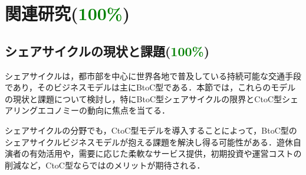 \section{関連研究(\textcolor{green}{100\%})}
  \label{sec:関連研究}
    \par
  
  \subsection{シェアサイクルの現状と課題(\textcolor{green}{100\%})}
    \label{sec:シェアサイクルの現状と課題}
      \par シェアサイクルは，都市部を中心に世界各地で普及している持続可能な交通手段であり，そのビジネスモデルは主にBtoC型である．本節では，これらのモデルの現状と課題について検討し，特にBtoC型シェアサイクルの限界とCtoC型シェアリングエコノミーの動向に焦点を当てる．
      \par シェアサイクルの分野でも，CtoC型モデルを導入することによって，BtoC型のシェアサイクルビジネスモデルが抱える課題を解決し得る可能性がある．遊休自演者の有効活用や，需要に応じた柔軟なサービス提供，初期投資や運営コストの削減など，CtoC型ならではのメリットが期待される．
      
